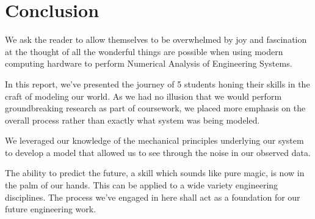 \section{Conclusion}

We ask the reader to allow themselves to be overwhelmed by joy and fascination at the thought of all the wonderful things are possible when using modern computing hardware to perform Numerical Analysis of Engineering Systems. 

In this report, we've presented the journey of 5 students honing their skills in the craft of modeling our world. As we had no illusion that we would perform groundbreaking research as part of coursework, we placed more emphasis on the overall process rather than exactly what system was being modeled. 

We leveraged our knowledge of the mechanical principles underlying our system to develop a model that allowed us to see through the noise in our observed data. 

The ability to predict the future, a skill which sounds like pure magic, is now in the palm of our hands. This can be applied to a wide variety engineering disciplines. The process we've engaged in here shall act as a foundation for our future engineering work. 
